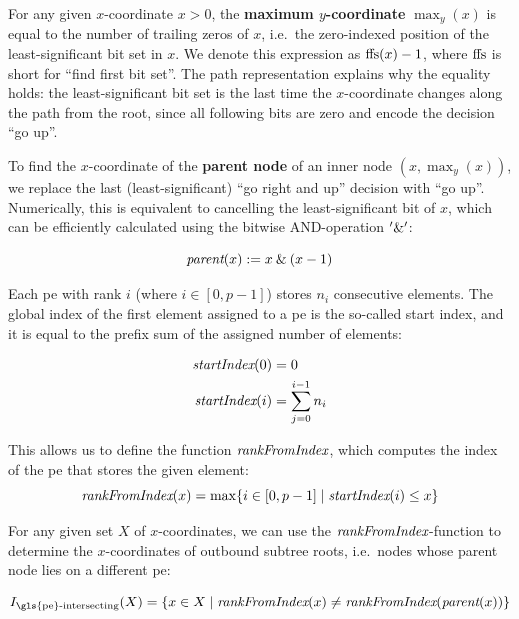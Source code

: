 For any given $x$-coordinate $x > 0$, the \textbf{maximum $y$-coordinate} $\max_y(x)$ is equal to the number of trailing zeros of $x$, i.e.\ the zero-indexed position of the least-significant bit set in $x$.
We denote this expression as $\textrm{ffs} (x) - 1$, where $\textrm{ffs}$ is short for \enquote{find first bit set}.
The path representation explains why the equality holds: the least-significant bit set is the last time the $x$-coordinate changes along the path from the root, since all following bits are zero and encode the decision \enquote{go up}.

To find the $x$-coordinate of the \textbf{parent node} of an inner node $(x, \max_y(x))$, we replace the last (least-significant) \enquote{go right and up} decision with \enquote{go up}. 
Numerically, this is equivalent to cancelling the least-significant bit of $x$, which can be efficiently calculated using the bitwise AND-operation $'\mathbin{\&}'$:

\begin{equation}
\label{eq:parent}
\textit{parent} (x) := x \mathbin{\&} (x - 1)
\end{equation}

Each \gls{pe} with rank $i$ (where $i \in [0, p - 1]$) stores $n_i$ consecutive elements.
The global index of the first element assigned to a \gls{pe} is the so-called start index, and it is equal to the prefix sum of the assigned number of elements:

\begin{align}
\textit{startIndex} (0) &= 0 \\
\textit{startIndex} (i) &= \sum_{j = 0}^{i - 1} n_i
\label{eq:startIndex}
\end{align}

This allows us to define the function $\textit{rankFromIndex}$, which computes the index of the \gls{pe} that stores the given element:
\begin{equation}
\textit{rankFromIndex} (x) = \max \{i \in [0, p - 1] \;|\; \textit{startIndex} (i) \leq x \}
\end{equation}

For any given set $X$ of $x$-coordinates, we can use the $\textit{rankFromIndex}$-function to determine the $x$-coordinates of outbound subtree roots, i.e.\ nodes whose parent node lies on a different \gls{pe}:

\newcommand{\rankIntersectingIndices}{I_{\textrm{\gls{pe}-intersecting}}}
\begin{equation}
\rankIntersectingIndices (X) = \{x \in X \;|\; \rankFromIndex (x) \neq \rankFromIndex (\parent (x)) \}
\end{equation}


